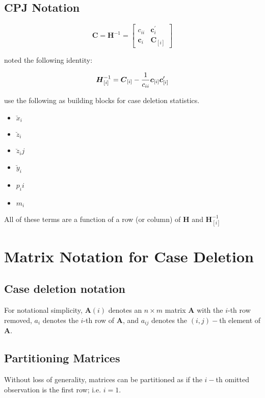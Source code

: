 \documentclass[Main.tex]{subfiles}
\begin{document}
\subsection{CPJ Notation} %

\[ \boldsymbol{C} = \boldsymbol{H}^{-1} = \left[
\begin{array}{cc}
c_{ii} & \boldsymbol{c}_{i}^{\prime}\\
\boldsymbol{c}_{i} &  \boldsymbol{C}_{[i]}
\end{array} \right]
\]

\citet{CPJ} noted the following identity:

\[ \boldsymbol{H}_{[i]}^{-1}  = \boldsymbol{C}_{[i]} - {1 \over c_{ii}}\boldsymbol{c}_{[i]}\boldsymbol{c}_{[i]}^{\prime} \]


\citet{CPJ} use the following as building blocks for case deletion statistics.
\begin{itemize}
	\item $\breve{x}_i$
	\item $\breve{z}_i$
	\item $\breve{z}_ij$
	\item $\breve{y}_i$
	\item $p_ii$
	\item $m_i$
\end{itemize}
All of these terms are a function of a row (or column) of $\boldsymbol{H}$ and $\boldsymbol{H}_{[i]}^{-1}$

\section{Matrix Notation for Case Deletion} %

\subsection{Case deletion notation} %

For notational simplicity, $\boldsymbol{A}(i)$ denotes an $n \times m$ matrix $\boldsymbol{A}$ with the $i$-th row
removed, $a_i$ denotes the $i$-th row of $\boldsymbol{A}$, and $a_{ij}$ denotes the $(i, j)-$th element of $\boldsymbol{A}$.

\subsection{Partitioning Matrices} %
Without loss of generality, matrices can be partitioned as if the $i-$th omitted observation is the first row; i.e. $i=1$.
\end{document}

